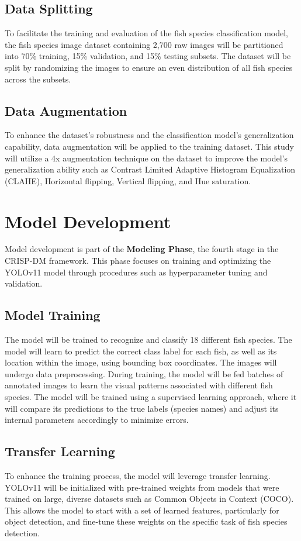 \subsection{Data Splitting}
To facilitate the training and evaluation of the fish species classification model, the fish species image dataset containing 2,700 raw images will be partitioned into 70\% training, 15\% validation, and 15\% testing subsets. The dataset will be split by randomizing the images to ensure an even distribution of all fish species across the subsets.

\subsection{Data Augmentation}
To enhance the dataset's robustness and the classification model's generalization capability, data augmentation will be applied to the training dataset. This study will utilize a 4x augmentation technique on the dataset to improve the model’s generalization ability such as  Contrast Limited Adaptive Histogram Equalization (CLAHE), Horizontal flipping, Vertical flipping, and  Hue saturation.



\section{Model Development}
Model development is part of the \textbf{Modeling Phase}, the fourth stage in the CRISP-DM framework. This phase focuses on training and optimizing the YOLOv11 model through procedures such as hyperparameter tuning and validation.


\subsection{Model Training}
The model will be trained to recognize and classify 18 different fish species. The model will learn to predict the correct class label for each fish, as well as its location within the image, using bounding box coordinates. The images will undergo data preprocessing. During training, the model will be fed batches of annotated images to learn the visual patterns associated with different fish species. The model will be trained using a supervised learning approach, where it will compare its predictions to the true labels (species names) and adjust its internal parameters accordingly to minimize errors.

\subsection{Transfer Learning}
To enhance the training process, the model will leverage transfer learning. YOLOv11 will be initialized with pre-trained weights from models that were trained on large, diverse datasets such as Common Objects in Context (COCO). This allows the model to start with a set of learned features, particularly for object detection, and fine-tune these weights on the specific task of fish species detection.

